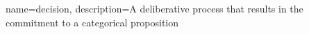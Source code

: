 {
    name=decision,
    description={A deliberative process that results in the commitment to a categorical proposition \cite{goldNeuralBasisDecision2007}}
}
